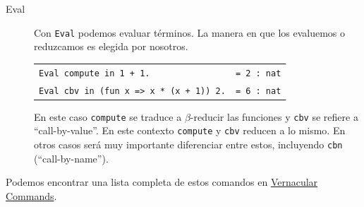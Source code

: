 \begin{description}
\begin{center}
\begin{tabular}{| l | l |}
  \hline
  \end{tabular}
  \end{center}
  \item[Eval] Con \texttt{Eval} podemos evaluar términos. La manera en que los evaluemos o reduzcamos es elegida por nosotros.
  \begin{center}
  \begin{tabular}{| l | l |}
  \hline
  \texttt{Eval compute in 1 + 1.} & \texttt{= 2 : nat} \\
  \texttt{Eval cbv in (fun x => x * (x + 1)) 2.} & \texttt{= 6 : nat} \\
  \hline
  \end{tabular}
  \end{center}
  En este caso \texttt{compute} se traduce a $\beta$-reducir las funciones y \texttt{cbv} se refiere a ``call-by-value''. En este contexto \texttt{compute} y \texttt{cbv} reducen a lo mismo. En otros casos será muy importante diferenciar entre estos, incluyendo \texttt{cbn} (``call-by-name'').
\end{description}

Podemos encontrar una lista completa de estos comandos en \href{https://coq.inria.fr/refman/proof-engine/vernacular-commands.html}{Vernacular Commands}.

